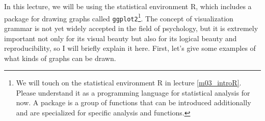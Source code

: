 \documentclass{ltjsbook}
\begin{document}
In this lecture, we will be using the statistical environment R, which includes a package for drawing graphs called \texttt{ggplot2}\parencite{ggplot2}\footnote{We will touch on the statistical environment R in lecture \ref{m03_introR}. Please understand it as a programming language for statistical analysis for now. A package is a group of functions that can be introduced additionally and are specialized for specific analysis and functions.}. The concept of visualization grammar is not yet widely accepted in the field of psychology, but it is extremely important not only for its visual beauty but also for its logical beauty and reproducibility, so I will briefly explain it here. First, let's give some examples of what kinds of graphs can be drawn.





\end{document}
